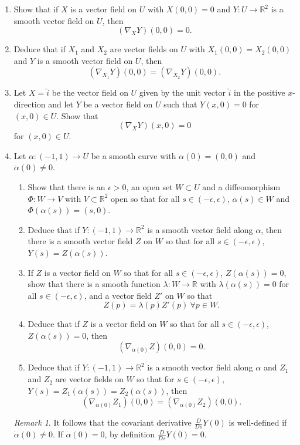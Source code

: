 \documentclass[11pt]{article}
\newcommand{\R}{\mathbb{R}}
\theoremstyle{remark}
\newtheorem*{remark}{Remark}
\begin{document}
\begin{enumerate}[resume]
\item Show that if $X$ is a vector field on $U$ with $X(0,0)=0$ and $Y\colon U\to\R^2$ is a
smooth vector field on $U$, then 
$$(\nabla_X Y)(0,0) = 0.$$

\item Deduce that if $X_1$ and $X_2$ are vector fields on $U$ with
$X_1(0,0)=X_2(0,0)$ and $Y$ is a
smooth vector field on $U$, then 
$$(\nabla_{X_1} Y)(0,0) = (\nabla_{X_2} Y)(0,0).$$

\item Let $X =\hat i$ be the vector field on $U$ given by the unit vector
$\hat{i}$ in the positive $x$-direction and let $Y$ be a vector field on $U$
such that $Y(x,0)=0$ for $(x,0)\in U$. Show that
$$(\nabla_{X} Y)(x,0) = 0$$
for $(x,0)\in U$.


\item Let $\alpha:(-1,1)\to U$ be a smooth curve with $\alpha(0)=(0,0)$ and
$\dot{\alpha}(0)\neq 0$. 
\begin{enumerate}
\item Show that there is an $\epsilon>0$, an open set $W\subset U$ and a
diffeomorphism $\Phi:W\to V$ with $V\subset \R^2$ open so that for all $s\in
(-\epsilon,\epsilon)$, $\alpha(s)\in W$ and $\Phi(\alpha(s)) = (s,0)$.
\item Deduce that if $Y:(-1,1)\to \R^2$ is a smooth vector field along $\alpha$,
then there is a smooth vector field $Z$ on $W$ so that for all $s\in
(-\epsilon,\epsilon)$, $Y(s)= Z(\alpha(s))$.
\item If $Z$ is a vector field on $W$ so that for all $s\in (-\epsilon,\epsilon)$,
$Z(\alpha(s))=0$, show that there is a smooth function $\lambda:W \to \R$ 
with $\lambda(\alpha(s)) =0$ for all $s\in (-\epsilon,\epsilon)$, and a
vector field $Z'$ on $W$ so that 
$$Z(p) = \lambda(p)Z'(p)\ \forall p\in W.$$ 
\item Deduce that if $Z$ is a vector field on $W$ so that for all $s\in
(-\epsilon,\epsilon)$,
$Z(\alpha(s))=0$, then
$$(\nabla_{\dot\alpha(0)}Z)(0,0) = 0.$$
\item Deduce that if $Y:(-1,1)\to \R^2$ is a smooth vector field along $\alpha$
and $Z_1$ and $Z_2$ are vector fields on $W$ so that for $s\in
(-\epsilon,\epsilon)$, $Y(s)= Z_1(\alpha(s)) = Z_2(\alpha(s))$, then
$$(\nabla_{\dot\alpha(0)}Z_1)(0,0) = (\nabla_{\dot\alpha(0)}Z_2)(0,0).$$
\end{enumerate}
\begin{remark}
It follows that the covariant derivative $\frac{D}{Ds}Y(0)$ is well-defined if
$\dot\alpha(0)\neq 0$. If $\dot\alpha(0) = 0$, by definition $\frac{D}{Ds}Y(0)=0$.
\end{remark}
\end{enumerate}
\end{document}
